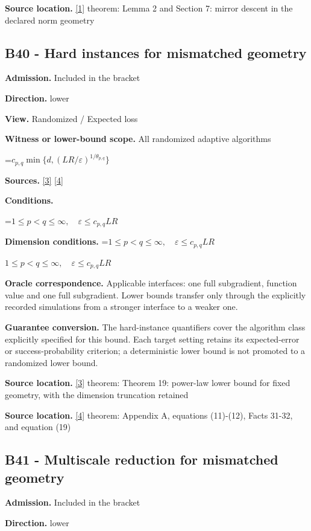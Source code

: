 \documentclass[10pt,a4paper]{article}
\newcommand{\AtlasMath}[1]{\par\begingroup\centering\setbox0=\hbox{$\displaystyle #1$}\ifdim\wd0>1.4\linewidth\typeout{ATLAS WIDE FORMULA: \the\wd0}\fi\ifdim\wd0>\linewidth\resizebox{\linewidth}{!}{\box0}\else\box0\fi\par\endgroup}
\newcommand{\AtlasInlineMath}[1]{\begingroup\setbox0=\hbox{$#1$}\ifdim\wd0>.4\linewidth\endgroup\AtlasMath{#1}\else\endgroup$#1$\fi}
\begin{document}
\textbf{Source location.} \href{https://arxiv.org/pdf/1107.4080}{[1]} theorem: Lemma 2 and Section 7: mirror descent in the declared norm geometry

\subsection{B40 - Hard instances for mismatched geometry}
\textbf{Admission.} Included in the bracket

\textbf{Direction.} lower

\textbf{View.} Randomized / Expected loss

\textbf{Witness or lower-bound scope.} All randomized adaptive algorithms

\AtlasMath{c_{p,q}\min\{d,(LR/\varepsilon)^{1/\theta_{p,q}}\}}
\textbf{Sources.} \href{https://arxiv.org/pdf/2609.20701}{[3]} \href{https://arxiv.org/pdf/2609.20687}{[4]}

\textbf{Conditions.} 
\AtlasMath{1\le p<q\le\infty,\quad\varepsilon\le c_{p,q}LR}


\textbf{Dimension conditions.} \AtlasInlineMath{1\le p<q\le\infty,\quad\varepsilon\le c_{p,q}LR}

\textbf{Oracle correspondence.} Applicable interfaces: one full subgradient, function value and one full subgradient. Lower bounds transfer only through the explicitly recorded simulations from a stronger interface to a weaker one.

\textbf{Guarantee conversion.} The hard-instance quantifiers cover the algorithm class explicitly specified for this bound. Each target setting retains its expected-error or success-probability criterion; a deterministic lower bound is not promoted to a randomized lower bound.

\textbf{Source location.} \href{https://arxiv.org/pdf/2609.20701}{[3]} theorem: Theorem 19: power-law lower bound for fixed geometry, with the dimension truncation retained

\textbf{Source location.} \href{https://arxiv.org/pdf/2609.20687}{[4]} theorem: Appendix A, equations (11)-(12), Facts 31-32, and equation (19)

\subsection{B41 - Multiscale reduction for mismatched geometry}
\textbf{Admission.} Included in the bracket

\textbf{Direction.} lower
\end{document}
